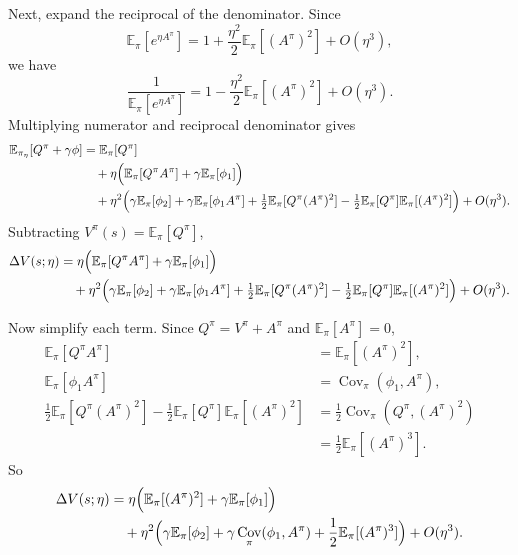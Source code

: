 \documentclass[11pt]{article}
\theoremstyle{definition}
\theoremstyle{remark}
\newcommand{\E}{\mathbb{E}}
\DeclareMathOperator{\Cov}{Cov}
\begin{document}
Next, expand the reciprocal of the denominator. Since
\[
  \E_\pi[e^{\eta A^\pi}]
  =
  1 + \frac{\eta^2}{2}\E_\pi[(A^\pi)^2] + O(\eta^3),
\]
we have
\[
  \frac{1}{\E_\pi[e^{\eta A^\pi}]}
  =
  1 - \frac{\eta^2}{2}\E_\pi[(A^\pi)^2] + O(\eta^3).
\]
Multiplying numerator and reciprocal denominator gives
\begin{align}
  \E_{\pi_\eta}[Q^\pi+\gamma\phi]
  &=
  \E_\pi[Q^\pi] \nonumber\\
  &\quad
  + \eta\Bigl(\E_\pi[Q^\pi A^\pi] + \gamma\E_\pi[\phi_1]\Bigr) \nonumber\\
  &\quad
  + \eta^2\Bigl(
      \gamma\E_\pi[\phi_2]
      + \gamma\E_\pi[\phi_1A^\pi]
      + \tfrac12 \E_\pi[Q^\pi(A^\pi)^2]
      - \tfrac12 \E_\pi[Q^\pi]\E_\pi[(A^\pi)^2]
    \Bigr)
  + O(\eta^3).
\end{align}
Subtracting $V^\pi(s)=\E_\pi[Q^\pi]$,
\begin{align}
  \Delta V(s;\eta)
  &=
  \eta\Bigl(\E_\pi[Q^\pi A^\pi] + \gamma\E_\pi[\phi_1]\Bigr) \nonumber\\
  &\quad
  + \eta^2\Bigl(
      \gamma\E_\pi[\phi_2]
      + \gamma\E_\pi[\phi_1A^\pi]
      + \tfrac12 \E_\pi[Q^\pi(A^\pi)^2]
      - \tfrac12 \E_\pi[Q^\pi]\E_\pi[(A^\pi)^2]
    \Bigr)
  + O(\eta^3).
\end{align}

Now simplify each term. Since $Q^\pi = V^\pi + A^\pi$ and $\E_\pi[A^\pi]=0$,
\begin{align}
  \E_\pi[Q^\pi A^\pi]
  &= \E_\pi[(A^\pi)^2], \\
  \E_\pi[\phi_1A^\pi]
  &= \Cov_\pi(\phi_1,A^\pi), \\
  \frac12 \E_\pi[Q^\pi(A^\pi)^2]
  - \frac12 \E_\pi[Q^\pi]\E_\pi[(A^\pi)^2]
  &= \frac12 \Cov_\pi(Q^\pi,(A^\pi)^2) \nonumber\\
  &= \frac12 \E_\pi[(A^\pi)^3].
\end{align}
So
\begin{align}
  \Delta V(s;\eta)
  &=
  \eta\Bigl(\E_\pi[(A^\pi)^2] + \gamma\E_\pi[\phi_1]\Bigr) \nonumber\\
  &\quad
  + \eta^2\Bigl(
      \gamma\E_\pi[\phi_2]
      + \gamma\Cov_\pi(\phi_1,A^\pi)
      + \frac12 \E_\pi[(A^\pi)^3]
    \Bigr)
  + O(\eta^3).
\end{align}
\end{document}
